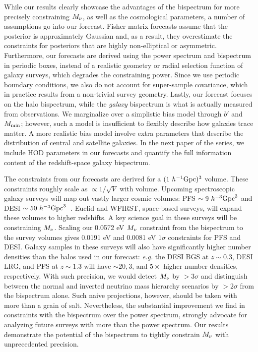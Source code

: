 While our results clearly showcase the advantages of the bispectrum for
more precisely constraining $M_\nu$, as well as the cosmological parameters, 
a number of assumptions go into our forecast. Fisher matrix forecasts assume 
that the posterior is approximately Gaussian and, as a result, they 
overestimate the constraints for posteriors that are highly non-elliptical 
or asymmetric. Furthermore, our forecasts are derived using the power spectrum 
and bispectrum in periodic boxes, instead of a realistic geometry or 
radial selection function of galaxy surveys, which degrades the constraining power. 
Since we use periodic boundary conditions, we also do not account for super-sample
covariance, which in practice results from a non-trivial survey geometry. Lastly, 
our forecast focuses on the halo bispectrum, while the \emph{galaxy} bispectrum 
is what is actually measured from observations. We marginalize over a simplistic bias 
model through $b'$ and $M_{\rm min}$; however, such a model is insufficient to 
flexibly describe how galaxies trace matter. A more realistic bias model 
involve extra parameters that describe the distribution of central and satellite 
galaxies. In the next paper of the series, we include HOD parameters in our
forecasts and quantify the full information content of the redshift-space 
galaxy bispectrum. 

The constraints from our forecasts are derived for a $(1~h^{-1}{\rm Gpc})^3$ 
volume. These constraints roughly scale as $\propto1/\sqrt{V}$ with volume. 
Upcoming spectroscopic galaxy surveys will map out vastly larger cosmic
volumes: PFS $\sim 9~h^{-3}{\rm Gpc}^3$ and DESI $\sim 50~h^{-3}{\rm Gpc}^3$~\citep{takada2014, desicollaboration2016}. 
Euclid and WFIRST, space-based surveys, will expand these volumes to 
higher redshifts. A key science goal in these surveys will be constraining $M_\nu$. 
Scaling our 0.0572 eV $M_\nu$ constraint from the bispectrum to the survey 
volumes gives 0.0191 eV and 0.0081 eV $1\sigma$ constraints for PFS and DESI. 
Galaxy samples in these surveys will also have significantly higher 
number densities than the halos used in our forecast: \emph{e.g.} 
the DESI BGS at $z{\sim}0.3$, DESI LRG, and PFS at $z \sim 1.3$ 
will have ${\sim}20, 3$, and $5\times$ higher number densities, 
respectively. With such precision, we would detect $M_\nu$ by $>3\sigma$ and 
distinguish between the normal and inverted neutrino mass hierarchy scenarios 
by $>2\sigma$ from the bispectrum alone. Such naive projections, however, 
should be taken with more than a grain of salt. Nevertheless, the substantial 
improvement we find in constraints with the bispectrum over the power spectrum, 
strongly advocate for analyzing future surveys with more than the power spectrum. 
Our results demonstrate the potential of the bispectrum to tightly constrain 
$M_\nu$ with unprecedented precision.

